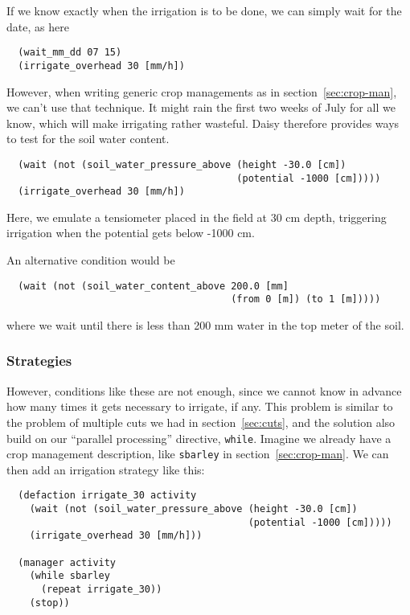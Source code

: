 \documentclass[a4paper]{article}
\begin{document}
If we know exactly when the irrigation is to be done, we can simply
wait for the date, as here
\begin{verbatim}
  (wait_mm_dd 07 15)
  (irrigate_overhead 30 [mm/h])
\end{verbatim}

However, when writing generic crop managements as in
section~\ref{sec:crop-man}, we can't use that technique.  It might
rain the first two weeks of July for all we know, which will make
irrigating rather wasteful.  Daisy therefore provides ways to test
for the soil water content.
\begin{verbatim}
  (wait (not (soil_water_pressure_above (height -30.0 [cm])
                                        (potential -1000 [cm]))))
  (irrigate_overhead 30 [mm/h])
\end{verbatim}
Here, we emulate a tensiometer placed in the field at 30 cm depth,
triggering irrigation when the potential gets below -1000 cm.


An alternative condition would be
\begin{verbatim}
  (wait (not (soil_water_content_above 200.0 [mm] 
                                       (from 0 [m]) (to 1 [m]))))
\end{verbatim}
where we wait until there is less than 200 mm water in the top meter
of the soil. 


\subsubsection{Strategies}

However, conditions like these are not enough, since we cannot know in
advance how many times it gets necessary to irrigate, if any.  This
problem is similar to the problem of multiple cuts we had in
section~\ref{sec:cuts}, and the solution also build on our ``parallel
processing'' directive, \texttt{while}.  Imagine we already have a
crop management description, like \texttt{sbarley} in
section~\ref{sec:crop-man}.  We can then add an irrigation strategy
like this:
\begin{verbatim}
  (defaction irrigate_30 activity 
    (wait (not (soil_water_pressure_above (height -30.0 [cm])
                                          (potential -1000 [cm]))))
    (irrigate_overhead 30 [mm/h]))

  (manager activity
    (while sbarley
      (repeat irrigate_30))
    (stop))
\end{verbatim}
\end{document}
